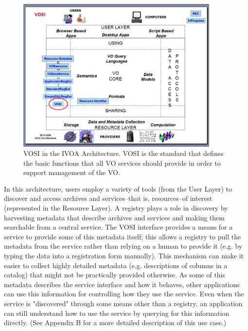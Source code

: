 \documentclass[11pt,letter]{ivoa}
\begin{document}
\begin{figure}
\centering


\includegraphics[width=0.9\textwidth]{archdiag.png}
\caption{VOSI in the IVOA Architecture. VOSI is the standard that defines the basic functions that all VO services should provide in order to support management of the VO.}
\label{fig:archdiag}
\end{figure}

In this architecture, users employ a variety of tools (from the User Layer) to discover and access archives and services--that is, resources--of interest (represented in the Resource Layer). A registry plays a role in discovery by harvesting metadata that describe archives and services and making them searchable from a central service. The VOSI interface provides a means for a service to provide some of this metadata itself; this allows a registry to pull the metadata from the service rather than relying on a human to provide it (e.g. by typing the data into a registration form manually). This mechanism can make it easier to collect highly detailed metadata (e.g. descriptions of columns in a catalog) that might not be practically provided otherwise. As some of this metadata describes the service interface and how it behaves, other applications can use this information for controlling how they use the service. Even when the service is "discovered" through some means other than a registry, an application can still understand how to use the service by querying for this information directly. (See Appendix B for a more detailed description of this use case.)
\end{document}
